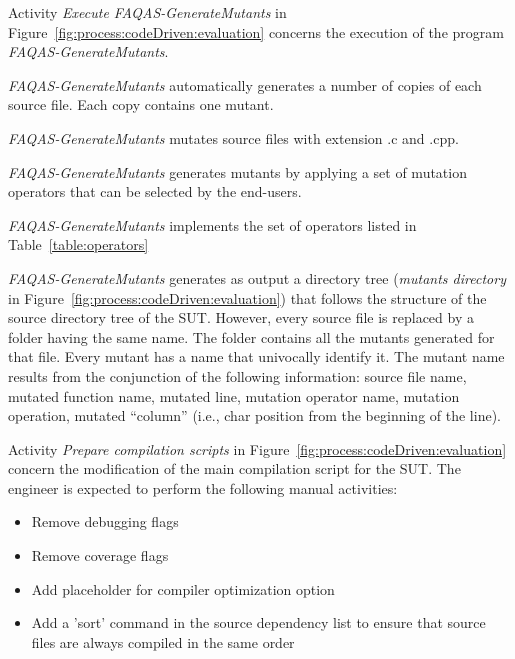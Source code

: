\RQ{} Activity \emph{Execute FAQAS-GenerateMutants} in Figure~\ref{fig:process:codeDriven:evaluation} concerns the execution of the program \emph{FAQAS-GenerateMutants}. 

\RQ{} \emph{FAQAS-GenerateMutants} automatically generates a number of copies of each source file. Each copy contains one mutant.

\RQ{} \emph{FAQAS-GenerateMutants} mutates source files with extension .c and .cpp.

\RQ{} \emph{FAQAS-GenerateMutants} generates mutants by applying a set of mutation operators that can be selected by the end-users.

\RQ{} \emph{FAQAS-GenerateMutants} implements the set of operators listed in Table~\ref{table:operators}




\RQ{} \emph{FAQAS-GenerateMutants} generates as output a directory tree (\emph{mutants directory} in Figure~\ref{fig:process:codeDriven:evaluation}) that follows the structure of the source directory tree of the SUT. However, every source file is replaced by a folder having the same name. The folder contains all the mutants generated for that file. Every mutant has a name that univocally identify it. The mutant name results from the conjunction of the following information:
source file name, mutated function name, mutated line, mutation operator name, mutation operation, mutated “column” (i.e., char position from the beginning of the line).








\RQ{} Activity \emph{Prepare compilation scripts} in Figure~\ref{fig:process:codeDriven:evaluation} concern the modification of the main compilation script for the SUT. The engineer is expected to perform the following manual activities:
\begin{itemize}
\item Remove debugging flags
\item Remove coverage flags
\item Add placeholder for compiler optimization option
\item Add a 'sort' command in the source dependency list to ensure that source files are always compiled in the same order
\end{itemize}



